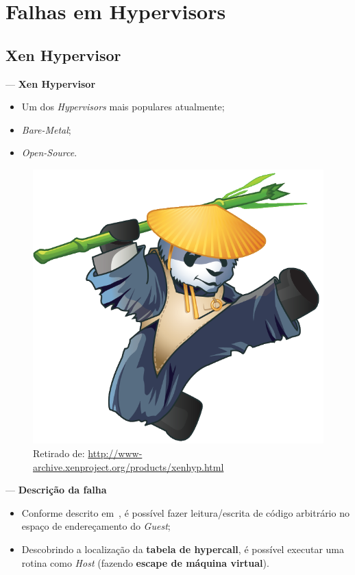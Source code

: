 \documentclass{beamer}
\newcommand{\source}[1]{\caption*{\tiny Retirado de: {#1}} }
\newcommand{\innertitle}[1]{\textbf{\large {#1}}}
\begin{document}
\section{Falhas em Hypervisors}

\subsection{Xen Hypervisor}

\begin{frame}{\secname{} --- \subsecname}
    \innertitle{Xen Hypervisor}

    \begin{itemize}
        \item Um dos \textit{Hypervisors} mais populares atualmente;
        \item \textit{Bare-Metal};
        \item \textit{Open-Source}.
    \end{itemize}

    \begin{figure}
        \includegraphics[keepaspectratio,height=.3\textheight]{img/xen-panda}
        \source{\url{http://www-archive.xenproject.org/products/xenhyp.html}}
    \end{figure}
\end{frame}

\begin{frame}{\secname{} --- \subsecname}
    \innertitle{Descrição da falha}

    \begin{itemize}
        \item Conforme descrito em~\cite{xen-exploit}, é possível fazer
            leitura/escrita de código arbitrário no espaço de endereçamento do
            \textit{Guest};
        \item Descobrindo a localização da \textbf{tabela de hypercall}, é
            possível executar uma rotina como \textit{Host} (fazendo
            \textbf{escape de máquina virtual}).
    \end{itemize}
\end{frame}
\end{document}

